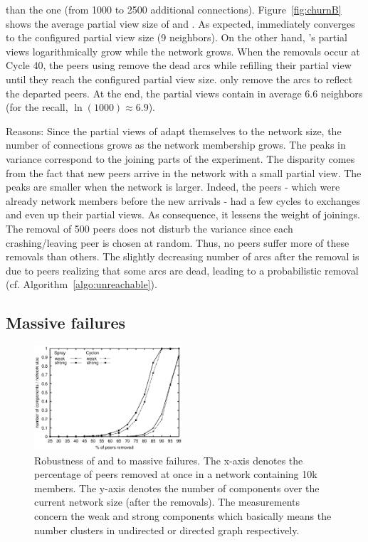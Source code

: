 \begin{asparadesc}
  than the \SPRAY one (from 1000 to 2500 additional
  connections). Figure~\ref{fig:churnB} shows the average partial view size of
  \SPRAY and \CYCLON. As expected, \CYCLON immediately converges to the
  configured partial view size (9 neighbors). On the other hand, \SPRAY's
  partial views logarithmically grow while the network grows. When the removals
  occur at Cycle 40, the peers using \CYCLON remove the dead arcs while
  refilling their partial view until they reach the configured partial view
  size. \SPRAY only remove the arcs to reflect the departed peers. At the end,
  the \SPRAY partial views contain in average 6.6 neighbors (for the recall,
  $\ln(1000)\approx 6.9$).
\item[Reasons:] Since the partial views of \SPRAY adapt themselves to the
  network size, the number of connections grows as the network membership
  grows.  The peaks in variance correspond to the joining parts of the
  experiment. The disparity comes from the fact that new peers arrive in the
  network with a small partial view. The peaks are smaller when the network is
  larger. Indeed, the peers - which were already network members before the new
  arrivals - had a few cycles to exchanges and even up their partial views. As
  consequence, it lessens the weight of joinings. The removal of 500 peers does
  not disturb the variance since each crashing/leaving peer is chosen at
  random. Thus, no peers suffer more of these removals than others. The
  slightly decreasing number of arcs after the removal is due to peers
  realizing that some arcs are dead, leading to a probabilistic removal
  (cf. Algorithm~\ref{algo:unreachable}). 
\end{asparadesc}

\subsection{Massive failures}
\label{subsec:resilience}

\begin{figure}
  \centering
  \includegraphics[width=0.49\textwidth]{img/resilience.eps}
  \caption{\label{fig:resilience}Robustness of \CYCLON and \SPRAY to massive
    failures. The x-axis denotes the percentage of peers removed at once in a
    network containing 10k members. The y-axis denotes the number of
    components over the current network size (after the removals). The
    measurements concern the weak and strong components which basically means
    the number clusters in undirected or directed graph respectively.}
\end{figure}

